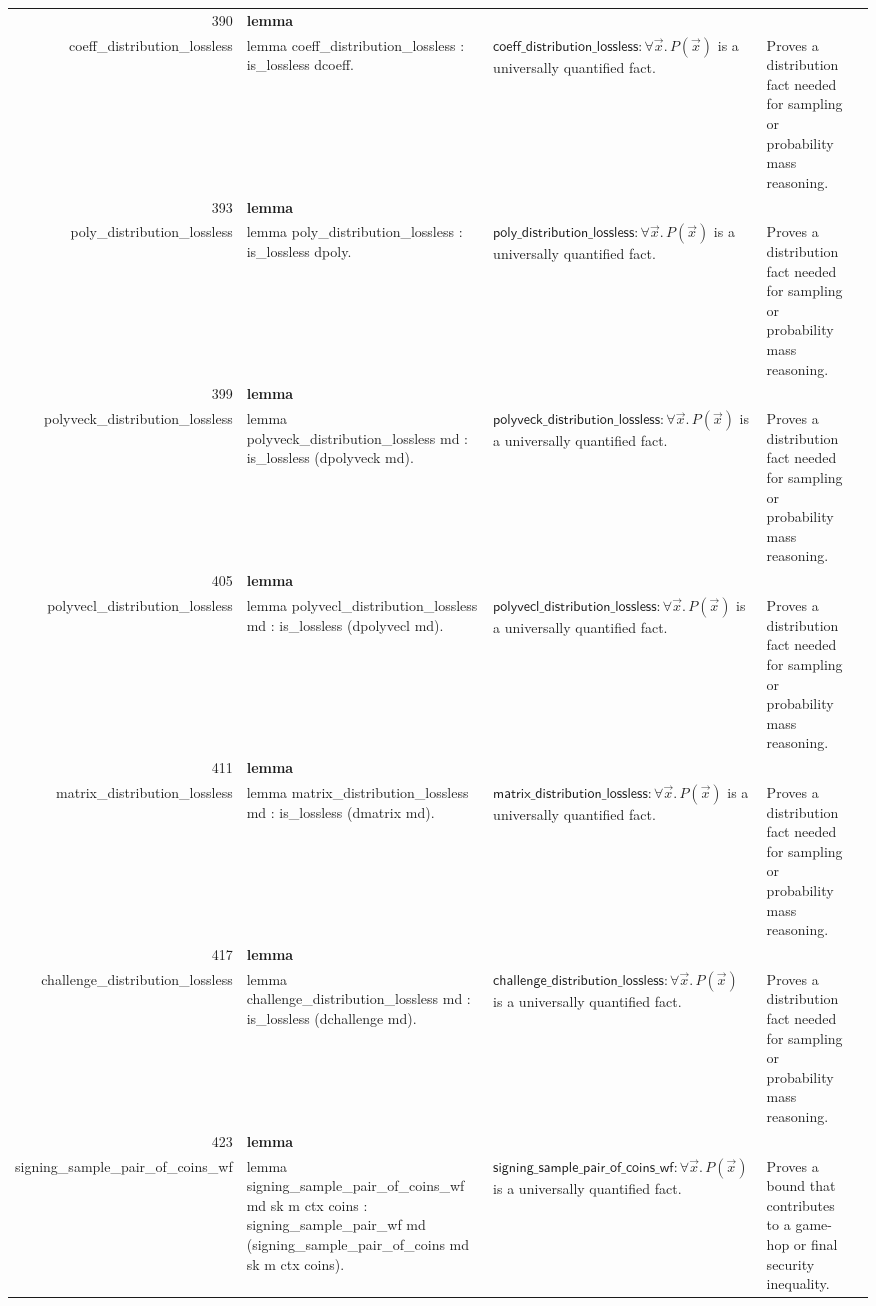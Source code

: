 \documentclass[10pt]{article}
\newcommand{\ec}[1]{\begingroup\ttfamily\scriptsize #1\endgroup}
\begin{document}
\begin{longtable}{r L{0.17\textwidth} L{0.26\textwidth} L{0.27\textwidth} L{0.20\textwidth}}
390 & \textbf{lemma}\\\ec{coeff\_distribution\_lossless} & \ec{lemma coeff\_distribution\_lossless : is\_lossless dcoeff.} & \(\mathsf{coeff\_distribution\_lossless} : \forall \vec{x}.\, P(\vec{x})\) is a universally quantified fact. & Proves a distribution fact needed for sampling or probability mass reasoning. \\
393 & \textbf{lemma}\\\ec{poly\_distribution\_lossless} & \ec{lemma poly\_distribution\_lossless : is\_lossless dpoly.} & \(\mathsf{poly\_distribution\_lossless} : \forall \vec{x}.\, P(\vec{x})\) is a universally quantified fact. & Proves a distribution fact needed for sampling or probability mass reasoning. \\
399 & \textbf{lemma}\\\ec{polyveck\_distribution\_lossless} & \ec{lemma polyveck\_distribution\_lossless md : is\_lossless (dpolyveck md).} & \(\mathsf{polyveck\_distribution\_lossless} : \forall \vec{x}.\, P(\vec{x})\) is a universally quantified fact. & Proves a distribution fact needed for sampling or probability mass reasoning. \\
405 & \textbf{lemma}\\\ec{polyvecl\_distribution\_lossless} & \ec{lemma polyvecl\_distribution\_lossless md : is\_lossless (dpolyvecl md).} & \(\mathsf{polyvecl\_distribution\_lossless} : \forall \vec{x}.\, P(\vec{x})\) is a universally quantified fact. & Proves a distribution fact needed for sampling or probability mass reasoning. \\
411 & \textbf{lemma}\\\ec{matrix\_distribution\_lossless} & \ec{lemma matrix\_distribution\_lossless md : is\_lossless (dmatrix md).} & \(\mathsf{matrix\_distribution\_lossless} : \forall \vec{x}.\, P(\vec{x})\) is a universally quantified fact. & Proves a distribution fact needed for sampling or probability mass reasoning. \\
417 & \textbf{lemma}\\\ec{challenge\_distribution\_lossless} & \ec{lemma challenge\_distribution\_lossless md : is\_lossless (dchallenge md).} & \(\mathsf{challenge\_distribution\_lossless} : \forall \vec{x}.\, P(\vec{x})\) is a universally quantified fact. & Proves a distribution fact needed for sampling or probability mass reasoning. \\
423 & \textbf{lemma}\\\ec{signing\_sample\_pair\_of\_coins\_wf} & \ec{lemma signing\_sample\_pair\_of\_coins\_wf md sk m ctx coins : signing\_sample\_pair\_wf md (signing\_sample\_pair\_of\_coins md sk m ctx coins).} & \(\mathsf{signing\_sample\_pair\_of\_coins\_wf} : \forall \vec{x}.\, P(\vec{x})\) is a universally quantified fact. & Proves a bound that contributes to a game-hop or final security inequality. \\

\end{longtable}
\end{document}
